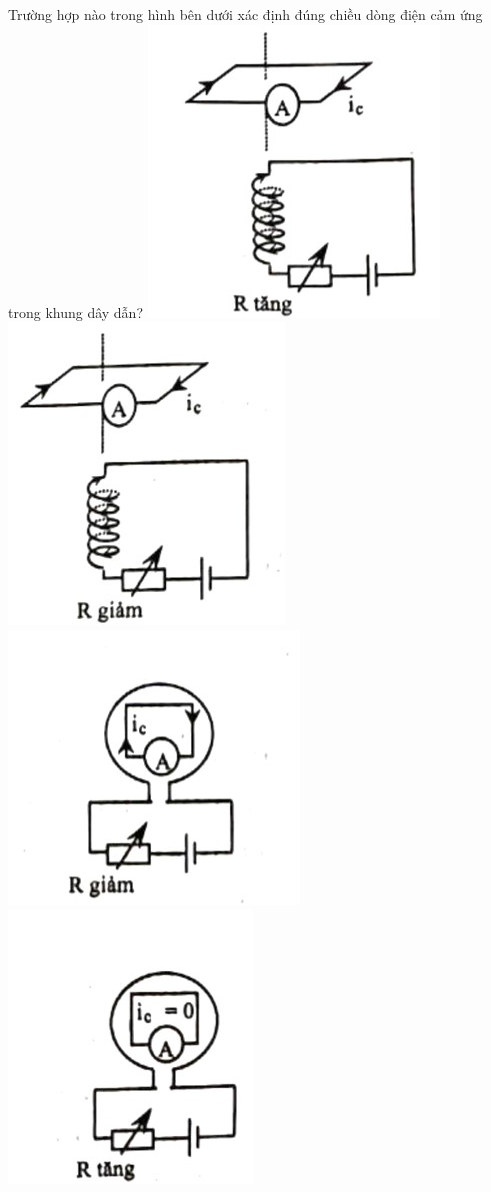 \begin{ex}
	Trường hợp nào trong hình bên dưới xác định đúng chiều dòng điện cảm ứng trong khung dây dẫn?
	\choice
	{\True \includegraphics[width=0.4\linewidth]{figs/VN12-Y24-PH-SYL-020P-15a}}
	{\includegraphics[width=0.4\linewidth]{figs/VN12-Y24-PH-SYL-020P-15b}}
	{\includegraphics[width=0.4\linewidth]{figs/VN12-Y24-PH-SYL-020P-15c}}
	{\includegraphics[width=0.4\linewidth]{figs/VN12-Y24-PH-SYL-020P-15d}}
	\loigiai{}
\end{ex}

